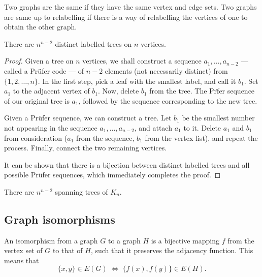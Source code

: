 \documentclass[11pt]{article}
\theoremstyle{definition}
\theoremstyle{remark}
\numberwithin{equation}{section}
\begin{document}
    \begin{definition}
        Two graphs are the same if they have the same vertex and edge sets. Two
        graphs are same up to relabelling if there is a way of relabelling the
        vertices of one to obtain the other graph.
    \end{definition}

    \begin{theorem}[Cayley]
        There are $n^{n - 2}$ distinct labelled trees on $n$ vertices.
    \end{theorem}
    \begin{proof}
        Given a tree on $n$ vertices, we shall construct a sequence $a_1, \dots, a_{n
        - 2}$ --- called a Pr\"ufer code --- of $n - 2$ elements (not necessarily
        distinct) from $\{1, 2, \dots, n\}$. In the first step, pick a leaf with the
        smallest label, and call it $b_1$. Set $a_1$ to the adjacent vertex of $b_1$.
        Now, delete $b_1$ from the tree. The Pr\"fer sequence of our original
        tree is $a_1$, followed by the sequence corresponding to the new tree.
        
        Given a Pr\"ufer sequence, we can construct a tree. Let $b_1$ be the smallest
        number not appearing in the sequence $a_1, \dots, a_{n - 2}$, and attach
        $a_1$ to it. Delete $a_1$ and $b_1$ from consideration ($a_1$ from the
        sequence, $b_1$ from the vertex list), and repeat the process. Finally,
        connect the two remaining vertices.

        It can be shown that there is a bijection between distinct labelled trees and
        all possible Pr\"ufer sequences, which immediately completes the proof.
    \end{proof}

    \begin{corollary}
        There are $n^{n - 2}$ spanning trees of $K_n$.
    \end{corollary}


    \subsection{Graph isomorphisms}
    \begin{definition}
        An isomorphism from a graph $G$ to a graph $H$ is a bijective mapping $f$
        from the vertex set of $G$ to that of $H$, such that it preserves the
        adjacency function. This means that \[
            \{x, y\} \in E(G) \;\Longleftrightarrow\; \{f(x), f(y)\} \in E(H).
        \] 
    \end{definition}
\end{document}
